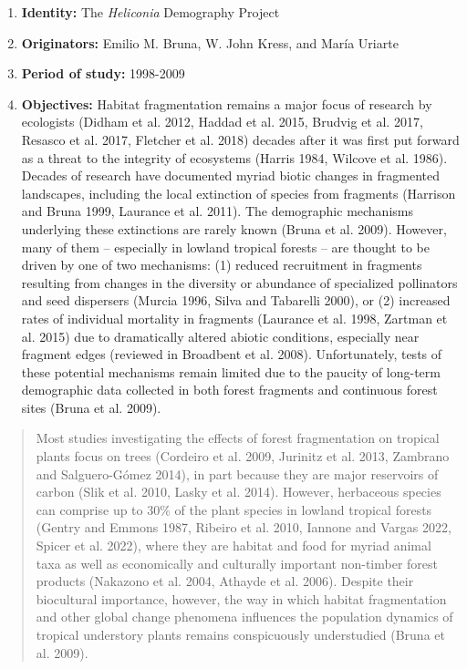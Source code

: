 \documentclass[
  12pt,
  man, donotrepeattitle,floatsintext]{apa6}
\begin{document}
\begin{enumerate}
\def\labelenumi{\arabic{enumi}.}
\item
  \textbf{Identity:} The \emph{Heliconia} Demography Project
\item
  \textbf{Originators:} Emilio M. Bruna, W. John Kress, and María Uriarte
\item
  \textbf{Period of study:} 1998-2009
\item
  \textbf{Objectives:} Habitat fragmentation remains a major focus of research by ecologists (Didham et al. 2012, Haddad et al. 2015, Brudvig et al. 2017, Resasco et al. 2017, Fletcher et al. 2018) decades after it was first put forward as a threat to the integrity of ecosystems (Harris 1984, Wilcove et al. 1986). Decades of research have documented myriad biotic changes in fragmented landscapes, including the local extinction of species from fragments (Harrison and Bruna 1999, Laurance et al. 2011). The demographic mechanisms underlying these extinctions are rarely known (Bruna et al. 2009). However, many of them -- especially in lowland tropical forests -- are thought to be driven by one of two mechanisms: (1) reduced recruitment in fragments resulting from changes in the diversity or abundance of specialized pollinators and seed dispersers (Murcia 1996, Silva and Tabarelli 2000), or (2) increased rates of individual mortality in fragments (Laurance et al. 1998, Zartman et al. 2015) due to dramatically altered abiotic conditions, especially near fragment edges (reviewed in Broadbent et al. 2008). Unfortunately, tests of these potential mechanisms remain limited due to the paucity of long-term demographic data collected in both forest fragments and continuous forest sites (Bruna et al. 2009).
\end{enumerate}

\begin{quote}
Most studies investigating the effects of forest fragmentation on tropical plants focus on trees (Cordeiro et al. 2009, Jurinitz et al. 2013, Zambrano and Salguero-Gómez 2014), in part because they are major reservoirs of carbon (Slik et al. 2010, Lasky et al. 2014). However, herbaceous species can comprise up to 30\% of the plant species in lowland tropical forests (Gentry and Emmons 1987, Ribeiro et al. 2010, Iannone and Vargas 2022, Spicer et al. 2022), where they are habitat and food for myriad animal taxa as well as economically and culturally important non-timber forest products (Nakazono et al. 2004, Athayde et al. 2006). Despite their biocultural importance, however, the way in which habitat fragmentation and other global change phenomena influences the population dynamics of tropical understory plants remains conspicuously understudied (Bruna et al. 2009).
\end{quote}
\end{document}
